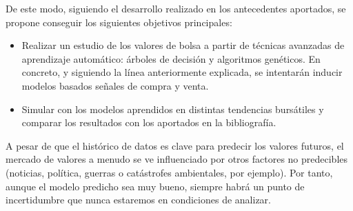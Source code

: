 	De este modo, siguiendo el desarrollo realizado en los antecedentes aportados, se propone conseguir los siguientes objetivos principales:
	
	\begin{itemize}
	    \item Realizar un estudio de los valores de bolsa a partir de t\'ecnicas avanzadas de aprendizaje autom\'atico: \'arboles de decisi\'on y algoritmos gen\'eticos. En concreto, y siguiendo la l\'inea anteriormente explicada, se intentar\'an inducir modelos basados se\~nales de compra y venta.
	    \item Simular con los modelos aprendidos en distintas tendencias burs\'atiles y comparar los resultados con los aportados en la bibliograf\'ia.
	\end{itemize}
	
	A pesar de que el hist\'orico de datos es clave para predecir los valores futuros, el mercado de valores a menudo se ve influenciado por otros factores no predecibles (noticias, pol\'itica, guerras o cat\'astrofes ambientales, por ejemplo). Por tanto, aunque el modelo predicho sea muy bueno, siempre habr\'a un punto de incertidumbre que nunca estaremos en condiciones de analizar.\\
	
	
	